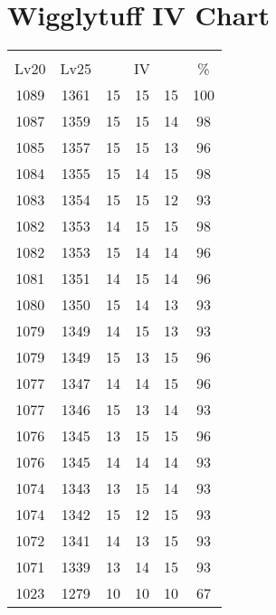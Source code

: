 \documentclass{article}%
\begin{document}
%
\normalsize%
\section{Wigglytuff IV Chart}%
\label{sec:Wigglytuff IV Chart}%
\renewcommand{\arraystretch}{1.5}%
\begin{tabular}{|c|c|c|c|c|c|}%
\hline%
\multicolumn{6}{|c|}{\textcolor{white}{ 
\linebreak{Wigglytuff}
}%
\cellcolor{black}}\\%
\multicolumn{1}{|c}{Lv20}&\multicolumn{1}{c|}{Lv25}&\multicolumn{3}{c|}{IV}&\multicolumn{1}{|c|}{\%}\\%
\hline%
\rowcolor{color100}%
1089&1361&15&15&15&100\\%
\hline%
\rowcolor{color98}%
1087&1359&15&15&14&98\\%
\hline%
\rowcolor{color96}%
1085&1357&15&15&13&96\\%
\hline%
\rowcolor{color98}%
1084&1355&15&14&15&98\\%
\hline%
\rowcolor{color93}%
1083&1354&15&15&12&93\\%
\hline%
\rowcolor{color98}%
1082&1353&14&15&15&98\\%
\hline%
\rowcolor{color96}%
1082&1353&15&14&14&96\\%
\hline%
\rowcolor{color96}%
1081&1351&14&15&14&96\\%
\hline%
\rowcolor{color93}%
1080&1350&15&14&13&93\\%
\hline%
\rowcolor{color93}%
1079&1349&14&15&13&93\\%
\hline%
\rowcolor{color96}%
1079&1349&15&13&15&96\\%
\hline%
\rowcolor{color96}%
1077&1347&14&14&15&96\\%
\hline%
\rowcolor{color93}%
1077&1346&15&13&14&93\\%
\hline%
\rowcolor{color96}%
1076&1345&13&15&15&96\\%
\hline%
\rowcolor{color93}%
1076&1345&14&14&14&93\\%
\hline%
\rowcolor{color93}%
1074&1343&13&15&14&93\\%
\hline%
\rowcolor{color93}%
1074&1342&15&12&15&93\\%
\hline%
\rowcolor{color93}%
1072&1341&14&13&15&93\\%
\hline%
\rowcolor{color93}%
1071&1339&13&14&15&93\\%
\hline%
\rowcolor{color91}%
1023&1279&10&10&10&67\\%
\end{tabular}

%
\end{document}
